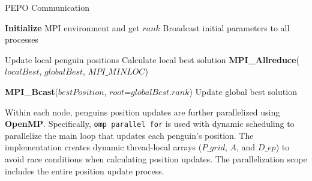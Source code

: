 \begin{algorithm}
\caption{PEPO Communication}
\begin{algorithmic}[1]
    \State \textbf{Initialize} MPI environment and get $rank$
        \State Broadcast initial parameters to all processes
    \EndIf
    
        \State Update local penguin positions
        \State Calculate local best solution 
        \State \textbf{MPI\_Allreduce}($localBest$, $globalBest$, $MPI\_MINLOC$)
        
            \State \textbf{MPI\_Bcast}($bestPosition$, $root$=$globalBest.rank$)
            \State Update global best solution
        \EndIf
    \EndFor
\EndProcedure
\end{algorithmic}
\end{algorithm}

Within each node, penguins position updates are further parallelized using \textbf{OpenMP}.
Specifically, \texttt{omp parallel for} is used with dynamic scheduling to parallelize the main loop that updates each penguin's position. The implementation creates dynamic thread-local arrays ($P\_grid$, $A$, and $D\_ep$) to avoid race conditions when calculating position updates.
The parallelization scope includes the entire position update process.
